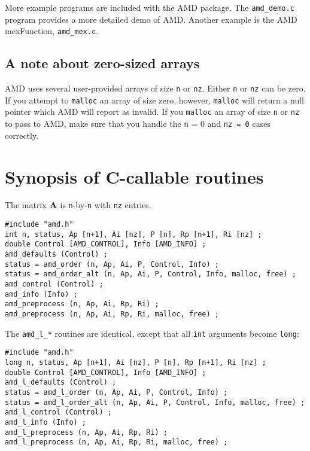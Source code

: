 \documentclass[11pt]{article}
\newcommand{\m}[1]{{\bf{#1}}}       %
\begin{document}
More example programs are included with the AMD package.
The {\tt amd\_demo.c} program provides a more detailed demo of AMD.
Another example is the AMD mexFunction, {\tt amd\_mex.c}.

\subsection{A note about zero-sized arrays}

AMD uses several user-provided arrays of size {\tt n} or {\tt nz}.
Either {\tt n} or {\tt nz} can be zero.
If you attempt to {\tt malloc} an array of size zero,
however, {\tt malloc} will return a null pointer which AMD will report
as invalid.  If you {\tt malloc} an array of
size {\tt n} or {\tt nz} to pass to AMD, make sure that you handle the
{\tt n} = 0 and {\tt nz = 0} cases correctly.

\section{Synopsis of C-callable routines}
\label{Synopsis}

The matrix $\m{A}$ is {\tt n}-by-{\tt n} with {\tt nz} entries.

{\footnotesize
\begin{verbatim}
#include "amd.h"
int n, status, Ap [n+1], Ai [nz], P [n], Rp [n+1], Ri [nz] ;
double Control [AMD_CONTROL], Info [AMD_INFO] ;
amd_defaults (Control) ;
status = amd_order (n, Ap, Ai, P, Control, Info) ;
status = amd_order_alt (n, Ap, Ai, P, Control, Info, malloc, free) ;
amd_control (Control) ;
amd_info (Info) ;
amd_preprocess (n, Ap, Ai, Rp, Ri) ;
amd_preprocess (n, Ap, Ai, Rp, Ri, malloc, free) ;
\end{verbatim}
}

The {\tt amd\_l\_*} routines are identical, except that all {\tt int}
arguments become {\tt long}:

{\footnotesize
\begin{verbatim}
#include "amd.h"
long n, status, Ap [n+1], Ai [nz], P [n], Rp [n+1], Ri [nz] ;
double Control [AMD_CONTROL], Info [AMD_INFO] ;
amd_l_defaults (Control) ;
status = amd_l_order (n, Ap, Ai, P, Control, Info) ;
status = amd_l_order_alt (n, Ap, Ai, P, Control, Info, malloc, free) ;
amd_l_control (Control) ;
amd_l_info (Info) ;
amd_l_preprocess (n, Ap, Ai, Rp, Ri) ;
amd_l_preprocess (n, Ap, Ai, Rp, Ri, malloc, free) ;
\end{verbatim}
}
\end{document}
